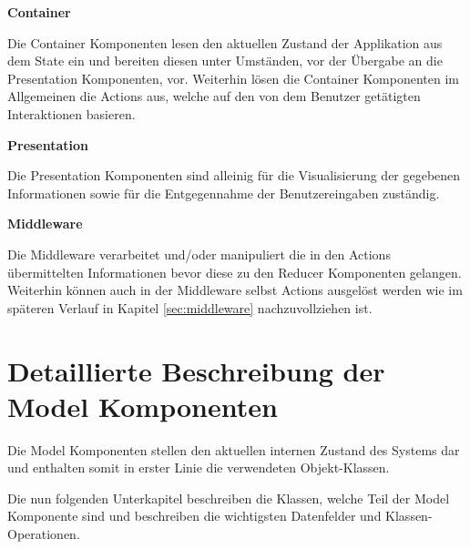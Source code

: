 \documentclass[bibliography=totoc,listof=totoc,BCOR=5mm,DIV=12,oneside]{scrbook}
\begin{document}
\par \bigskip \textbf{Container}
\par Die Container Komponenten lesen den aktuellen Zustand der Applikation aus dem State ein und bereiten diesen unter Umständen, vor der Übergabe an die Presentation Komponenten, vor. Weiterhin lösen die Container Komponenten im Allgemeinen die Actions aus, welche auf den von dem Benutzer getätigten Interaktionen basieren.

\par \bigskip \textbf{Presentation}
\par Die Presentation Komponenten sind alleinig für die Visualisierung der gegebenen Informationen sowie für die Entgegennahme der Benutzereingaben zuständig.

\par \bigskip \textbf{Middleware}
\par Die Middleware verarbeitet und/oder manipuliert die in den Actions übermittelten Informationen bevor diese zu den Reducer Komponenten gelangen. Weiterhin können auch in der Middleware selbst Actions ausgelöst werden wie im späteren Verlauf in Kapitel \ref{sec:middleware} nachzuvollziehen ist. 

\newpage
\section{Detaillierte Beschreibung der Model Komponenten}
\label{sec:komponentenDetails}
\par Die Model Komponenten stellen den aktuellen internen Zustand des Systems dar und enthalten somit in erster Linie die verwendeten Objekt-Klassen. 
\par \medskip Die nun folgenden Unterkapitel beschreiben die Klassen, welche Teil der Model Komponente sind und beschreiben die wichtigsten Datenfelder und Klassen-Operationen.
\end{document}
